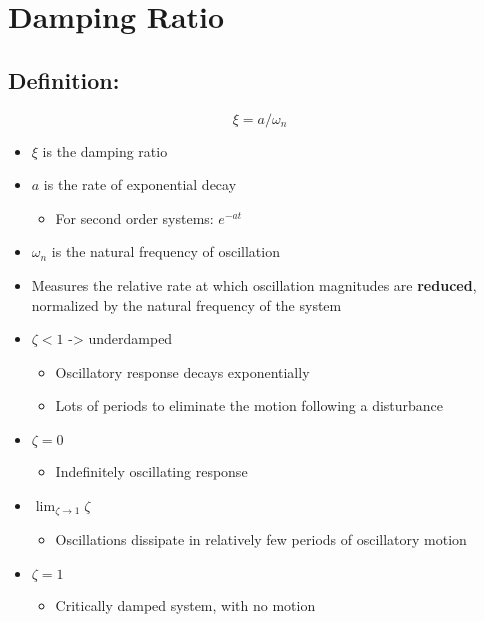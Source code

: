 \documentclass[10pt]{report}
\begin{document}
\chapter{Damping Ratio}\label{ch:Damping Ratio}


\section{Definition: }

$$\xi = a/\omega_{n}$$

\begin{itemize}
\item $\xi$ is the damping ratio
\item $a$ is the rate of exponential decay

\begin{itemize}
\item For second order systems: $e^{-at}$ 

\end{itemize}
\item $\omega_{n}$ is the natural frequency of oscillation 

\item Measures the relative rate at which oscillation magnitudes are \textbf{reduced}, normalized by the natural frequency of the system

\item $\zeta < 1$ ->  underdamped

\begin{itemize}
\item Oscillatory response decays exponentially 

\item Lots of periods to eliminate the motion following a disturbance

\end{itemize}
\item $\zeta=0$ 

\begin{itemize}
\item Indefinitely oscillating response

\end{itemize}
\item $\lim_{\zeta \rightarrow 1} \zeta$

\begin{itemize}
\item Oscillations dissipate in relatively few periods of oscillatory motion

\end{itemize}
\item $\zeta=1$ 

\begin{itemize}
\item Critically damped system, with no motion

\end{itemize}
\end{itemize}
\end{document}
